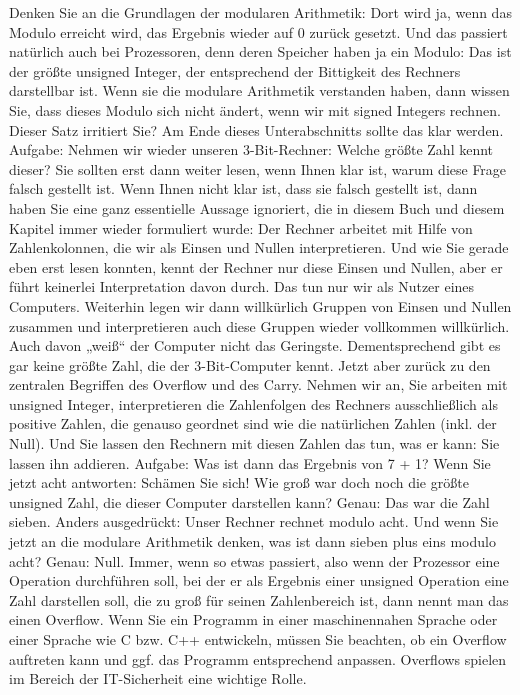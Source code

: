 Denken Sie an die Grundlagen der modularen Arithmetik: Dort wird ja, wenn das Modulo erreicht wird, das Ergebnis wieder auf 0 zurück gesetzt. Und das passiert natürlich auch bei Prozessoren, denn deren Speicher haben ja ein Modulo: Das ist der größte unsigned Integer, der entsprechend der Bittigkeit des Rechners darstellbar ist.
Wenn sie die modulare Arithmetik verstanden haben, dann wissen Sie, dass dieses Modulo sich nicht ändert, wenn wir mit signed Integers rechnen. Dieser Satz irritiert Sie? Am Ende dieses Unterabschnitts sollte das klar werden.
Aufgabe:
Nehmen wir wieder unseren 3-Bit-Rechner: Welche größte Zahl kennt dieser?
Sie sollten erst dann weiter lesen, wenn Ihnen klar ist, warum diese Frage falsch gestellt ist. Wenn Ihnen nicht klar ist, dass sie falsch gestellt ist, dann haben Sie eine ganz essentielle Aussage ignoriert, die in diesem Buch und diesem Kapitel immer wieder formuliert wurde: Der Rechner arbeitet mit Hilfe von Zahlenkolonnen, die wir als Einsen und Nullen interpretieren. Und wie Sie gerade eben erst lesen konnten, kennt der Rechner nur diese Einsen und Nullen, aber er führt keinerlei Interpretation davon durch. Das tun nur wir als Nutzer eines Computers. Weiterhin legen wir dann willkürlich Gruppen von Einsen und Nullen zusammen und interpretieren auch diese Gruppen wieder vollkommen willkürlich. Auch davon „weiß“ der Computer nicht das Geringste. Dementsprechend gibt es gar keine größte Zahl, die der 3-Bit-Computer kennt.
Jetzt aber zurück zu den zentralen Begriffen des Overflow und des Carry.
Nehmen wir an, Sie arbeiten mit unsigned Integer, interpretieren die Zahlenfolgen des Rechners ausschließlich als positive Zahlen, die genauso geordnet sind wie die natürlichen Zahlen (inkl. der Null). Und Sie lassen den Rechnern mit diesen Zahlen das tun, was er kann: Sie lassen ihn addieren. 
Aufgabe:
Was ist dann das Ergebnis von 7 + 1?
Wenn Sie jetzt acht antworten: Schämen Sie sich! Wie groß war doch noch die größte unsigned Zahl, die dieser Computer darstellen kann? Genau: Das war die Zahl sieben. Anders ausgedrückt: Unser Rechner rechnet modulo acht. Und wenn Sie jetzt an die modulare Arithmetik denken, was ist dann sieben plus eins modulo acht? Genau: Null. Immer, wenn so etwas passiert, also wenn der Prozessor eine Operation durchführen soll, bei der er als Ergebnis einer unsigned Operation eine Zahl darstellen soll, die zu groß für seinen Zahlenbereich ist, dann nennt man das einen Overflow.
Wenn Sie ein Programm in einer maschinennahen Sprache oder einer Sprache wie C bzw. C++ entwickeln, müssen Sie beachten, ob ein Overflow auftreten kann und ggf. das Programm entsprechend anpassen. Overflows spielen im Bereich der IT-Sicherheit eine wichtige Rolle.
